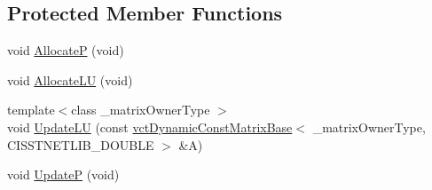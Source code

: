 \subsection*{Protected Member Functions}
\begin{DoxyCompactItemize}
\item 
void \hyperlink{classnmr_l_u_solver_aa6b9b7130bb8050e756ed056302f1634}{Allocate\+P} (void)
\item 
void \hyperlink{classnmr_l_u_solver_a58ce0aa8fc09a34a051eede8df6e7c9b}{Allocate\+L\+U} (void)
\item 
{\footnotesize template$<$class \+\_\+matrix\+Owner\+Type $>$ }\\void \hyperlink{classnmr_l_u_solver_ad57b9220fbfe71a397198413834af463}{Update\+L\+U} (const \hyperlink{classvct_dynamic_const_matrix_base}{vct\+Dynamic\+Const\+Matrix\+Base}$<$ \+\_\+matrix\+Owner\+Type, C\+I\+S\+S\+T\+N\+E\+T\+L\+I\+B\+\_\+\+D\+O\+U\+B\+L\+E $>$ \&A)
\item 
void \hyperlink{classnmr_l_u_solver_a769ea98a8a502b8a3cbf6e18e2371034}{Update\+P} (void)
\end{DoxyCompactItemize}
